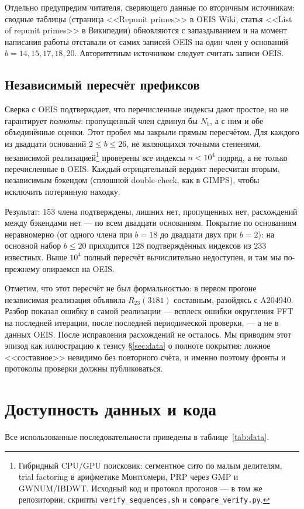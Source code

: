 \documentclass[11pt,a4paper]{article}
\theoremstyle{plain}
\theoremstyle{remark}
\begin{document}
Отдельно предупредим читателя, сверяющего данные по вторичным источникам: сводные
таблицы (страница <<Repunit primes>> в OEIS Wiki, статья <<List of repunit primes>>
в Википедии) обновляются с запаздыванием и на момент написания работы отставали
от самих записей OEIS на один член у оснований $b=14,15,17,18,20$. Авторитетным
источником следует считать записи OEIS.

\subsection*{Независимый пересчёт префиксов}

Сверка с OEIS подтверждает, что перечисленные индексы дают простое, но не
гарантирует \emph{полноты}: пропущенный член сдвинул бы $N_b$, а с ним и обе
объединённые оценки. Этот пробел мы закрыли прямым пересчётом. Для каждого из
двадцати оснований $2\le b\le26$, не являющихся точными степенями, независимой
реализацией\footnote{Гибридный CPU/GPU поисковик: сегментное сито по малым
делителям, trial factoring в арифметике Монтгомери, PRP через GMP и GWNUM/IBDWT.
Исходный код и протокол прогонов --- в том же репозитории, скрипты
\texttt{verify\_sequences.sh} и \texttt{compare\_verify.py}.} проверены
\emph{все} индексы $n<10^4$ подряд, а не только перечисленные в OEIS. Каждый
отрицательный вердикт пересчитан вторым, независимым бэкендом (сплошной
double-check, как в GIMPS), чтобы исключить потерянную находку.

Результат: $153$ члена подтверждены, лишних нет, пропущенных нет, расхождений
между бэкендами нет --- по всем двадцати основаниям. Покрытие по основаниям
неравномерно (от одного члена при $b=18$ до двадцати двух при $b=2$): на
основной набор $b\le20$ приходится $128$ подтверждённых индексов из $233$
известных. Выше $10^4$ полный пересчёт вычислительно недоступен, и там мы
по-прежнему опираемся на OEIS.

Отметим, что этот пересчёт не был формальностью: в первом прогоне независимая
реализация объявила $R_{23}(3181)$ составным, разойдясь с A204940. Разбор показал
ошибку в самой реализации --- всплеск ошибки округления FFT на последней итерации,
после последней периодической проверки, --- а не в данных OEIS. После исправления
расхождений не осталось. Мы приводим этот эпизод как иллюстрацию к тезису
\S\ref{sec:data} о полноте покрытия: ложное <<составное>> невидимо без повторного счёта, и именно
поэтому фронты и протоколы проверки должны публиковаться.

\section*{Доступность данных и кода}
Все использованные последовательности приведены в таблице~\ref{tab:data}.
\end{document}
